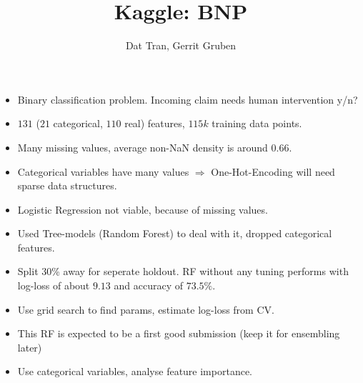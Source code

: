 \documentclass[pdf, 16pt]{beamer}
\title{Kaggle: BNP}
\author{Dat Tran, Gerrit Gruben}
\begin{document}
\frame{\maketitle}

\begin{frame}
	\begin{itemize}
      \item Binary classification problem. Incoming claim needs human intervention
      y/n?
\pause \item $131$ ($21$ categorical, $110$ real) features, $115k$ training data points. 
  \end{itemize}
\end{frame}

\begin{frame}

\begin{itemize}
       \item Many missing values, average non-NaN density is around $0.66$.
 \pause \item Categorical variables have many values $\Rightarrow$
One-Hot-Encoding will need sparse data structures.
\end{itemize}

\end{frame}

\begin{frame}[Experiments]

\begin{itemize}
  \item Logistic Regression not viable, because of missing values.
\pause \item Used Tree-models (Random Forest) to deal with it, dropped
categorical features.
\pause \item Split 30\% away for seperate holdout. RF without any tuning
performs with log-loss of about $9.13$ and accuracy of $73.5\%$.
\end{itemize}
\end{frame}

\begin{frame}

\begin{itemize}
  \item Use grid search to find params, estimate log-loss from CV.
\pause \item This RF is expected to be a first good submission (keep it for ensembling
    later)
\pause \item Use categorical variables, analyse feature importance.
\end{itemize}

\end{frame}
\end{document}
